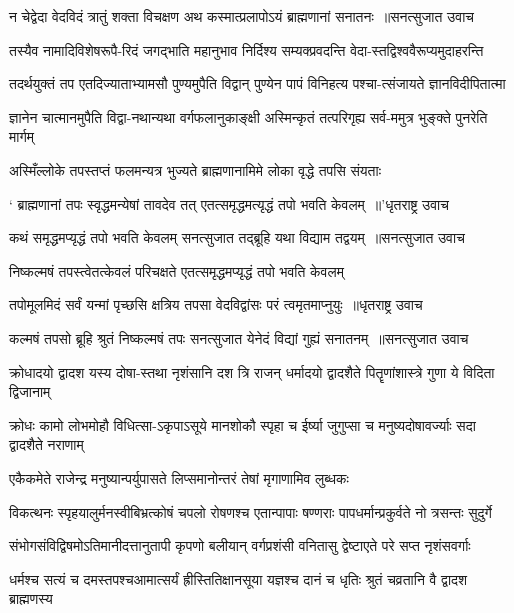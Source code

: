 \threelineshloka
{न चेद्वेदा वेदविदं त्रातुं शक्ता विचक्षण}
{अथ कस्मात्प्रलापोऽयं ब्राह्मणानां सनातनः ॥सनत्सुजात उवाच}
{}


\twolineshloka
{तस्यैव नामादिविशेषरूपै-रिदं जगद्भाति महानुभाव}
{निर्दिश्य सम्यक्प्रवदन्ति वेदा-स्तद्विश्ववैरूप्यमुदाहरन्ति}


\twolineshloka
{तदर्थयुक्तं तप एतदिज्याताभ्यामसौ पुण्यमुपैति विद्वान्}
{पुण्येन पापं विनिहत्य पश्चा-त्संजायते ज्ञानविदीपितात्मा}


\twolineshloka
{ज्ञानेन चात्मानमुपैति विद्वा-नथान्यथा वर्गफलानुकाङ्क्षी}
{अस्मिन्कृतं तत्परिगृह्य सर्व-ममुत्र भुङ्क्ते पुनरेति मार्गम्}


\twolineshloka
{अस्मिँल्लोके तपस्तप्तं फलमन्यत्र भुज्यते}
{ब्राह्मणानामिमे लोका वृद्धे तपसि संयताः}


\threelineshloka
{` ब्राह्मणानां तपः स्वृद्धमन्येषां तावदेव तत्}
{एतत्समृद्धमत्यृद्धं तपो भवति केवलम् ॥'धृतराष्ट्र उवाच}
{}


\threelineshloka
{कथं समृद्धमप्यृद्धं तपो भवति केवलम्}
{सनत्सुजात तद्ब्रूहि यथा विद्याम तद्वयम् ॥सनत्सुजात उवाच}
{}


\twolineshloka
{निष्कल्मषं तपस्त्वेतत्केवलं परिचक्षते}
{एतत्समृद्धमप्यृद्धं तपो भवति केवलम्}


\threelineshloka
{तपोमूलमिदं सर्वं यन्मां पृच्छसि क्षत्रिय}
{तपसा वेदविद्वांसः परं त्वमृतमाप्नुयुः ॥धृतराष्ट्र उवाच}
{}


\threelineshloka
{कल्मषं तपसो ब्रूहि श्रुतं निष्कल्मषं तपः}
{सनत्सुजात येनेदं विद्यां गुह्यं सनातनम् ॥सनत्सुजात उवाच}
{}


\twolineshloka
{क्रोधादयो द्वादश यस्य दोषा-स्तथा नृशंसानि दश त्रि राजन्}
{धर्मादयो द्वादशैते पितॄणांशास्त्रे गुणा ये विदिता द्विजानाम्}


\twolineshloka
{क्रोधः कामो लोभमोहौ विधित्सा-ऽकृपाऽसूये मानशोकौ स्पृहा च}
{ईर्ष्या जुगुप्सा च मनुष्यदोषावर्ज्याः सदा द्वादशैते नराणाम्}


\twolineshloka
{एकैकमेते राजेन्द्र मनुष्यान्पर्युपासते}
{लिप्समानोन्तरं तेषां मृगाणामिव लुब्धकः}


\twolineshloka
{विकत्थनः स्पृहयालुर्मनस्वीबिभ्रत्कोषं चपलो रोषणश्च}
{एतान्पापाः षण्णराः पापधर्मान्प्रकुर्वते नो त्रसन्तः सुदुर्गे}


\twolineshloka
{संभोगसंविद्विषमोऽतिमानीदत्तानुतापी कृपणो बलीयान्}
{वर्गप्रशंसी वनितासु द्वेष्टाएते परे सप्त नृशंसवर्गाः}


\twolineshloka
{धर्मश्च सत्यं च दमस्तपश्चआमात्सर्यं ह्रीस्तितिक्षानसूया}
{यज्ञश्च दानं च धृतिः श्रुतं चव्रतानि वै द्वादश ब्राह्मणस्य}


